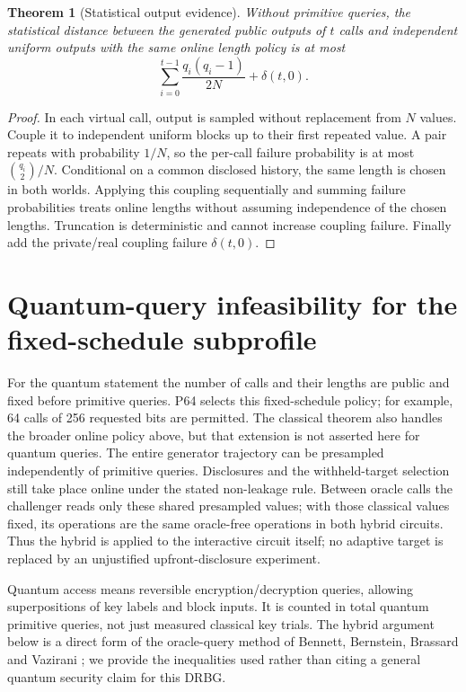\documentclass[11 pt,a 4 paper]{article}
\newtheorem{theorem}{Theorem}
\begin{document}
\begin{theorem}[Statistical output evidence]\label{thm:statistics}
Without primitive queries, the statistical distance between the generated public outputs of $ t $ calls and independent uniform outputs with the same online length policy is at most
\begin{equation}
 \sum_{i=0}^{t-1}\frac{q_i(q_i-1)}{2 N}+\delta(t,0).\label{eq:stat}
\end{equation}
\end{theorem}
\begin{proof}
In each virtual call, output is sampled without replacement from $ N $ values. Couple it to independent uniform blocks up to their first repeated value. A pair repeats with probability $1/N $, so the per-call failure probability is at most $\binom{q_i}{2}/N $. Conditional on a common disclosed history, the same length is chosen in both worlds. Applying this coupling sequentially and summing failure probabilities treats online lengths without assuming independence of the chosen lengths. Truncation is deterministic and cannot increase coupling failure. Finally add the private/real coupling failure $\delta(t,0)$.
\end{proof}

\section{Quantum-query infeasibility for the fixed-schedule subprofile}
\label{sec:quantum}
For the quantum statement the number of calls and their lengths are public and fixed before primitive queries. P64 selects this fixed-schedule policy; for example, 64 calls of 256 requested bits are permitted. The classical theorem also handles the broader online policy above, but that extension is not asserted here for quantum queries. The entire generator trajectory can be presampled independently of primitive queries. Disclosures and the withheld-target selection still take place online under the stated non-leakage rule. Between oracle calls the challenger reads only these shared presampled values; with those classical values fixed, its operations are the same oracle-free operations in both hybrid circuits. Thus the hybrid is applied to the interactive circuit itself; no adaptive target is replaced by an unjustified upfront-disclosure experiment.

Quantum access means reversible encryption/decryption queries, allowing superpositions of key labels and block inputs. It is counted in total quantum primitive queries, not just measured classical key trials. The hybrid argument below is a direct form of the oracle-query method of Bennett, Bernstein, Brassard and Vazirani \cite{bbbv}; we provide the inequalities used rather than citing a general quantum security claim for this DRBG.
\end{document}
